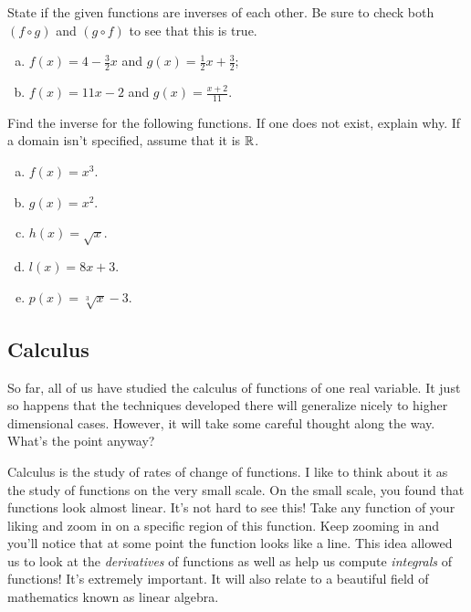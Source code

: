     \begin{problem}
    State if the given functions are inverses of each other. Be sure to check both $(f\circ g)$ and $(g\circ f)$ to see that this is true.
    \begin{enumerate}[(a)]
        \item $\displaystyle{f(x)=4-\frac{3}{2}x}$ and $g(x)=\displaystyle{\frac{1}{2}x+\frac{3}{2}}$;
        \item $f(x)=11x-2$ and $\displaystyle{g(x)=\frac{x+2}{11}}$.
    \end{enumerate}
    \end{problem}
    
    \begin{problem}
    Find the inverse for the following functions. If one does not exist, explain why. If a domain isn't specified, assume that it is $\mathbb{R}$.
    \begin{enumerate}[(a)]
        \item $f(x)=x^3$.
        \item $g(x)=x^2$.
        \item $h(x)=\sqrt{x}$.
        \item $l(x)=8x+3$.
        \item $p(x)=\sqrt[3]{x}-3$.
    \end{enumerate}
    \end{problem}
    
    
    
    \subsection{Calculus}
    
    So far, all of us have studied the calculus of functions of one real variable.  It just so happens that the techniques developed there will generalize nicely to higher dimensional cases.  However, it will take some careful thought along the way.  What's the point anyway?
    
    Calculus is the study of rates of change of functions.  I like to think about it as the study of functions on the very small scale.  On the small scale, you found that functions look almost linear.  It's not hard to see this!  Take any function of your liking and zoom in on a specific region of this function. Keep zooming in and you'll notice that at some point the function looks like a line.  This idea allowed us to look at the \emph{derivatives} of functions as well as help us compute \emph{integrals} of functions!  It's extremely important.  It will also relate to a beautiful field of mathematics known as linear algebra. 
    
